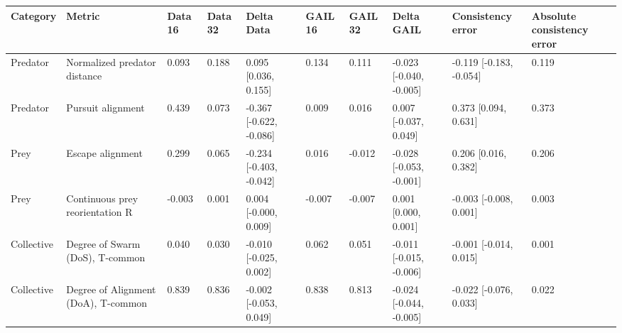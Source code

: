 \begin{tabular}{llllllllll}
\toprule
Category & Metric & Data 16 & Data 32 & Delta Data & GAIL 16 & GAIL 32 & Delta GAIL & Consistency error & Absolute consistency error \\
\midrule
Predator & Normalized predator distance & 0.093 & 0.188 & 0.095 [0.036, 0.155] & 0.134 & 0.111 & -0.023 [-0.040, -0.005] & -0.119 [-0.183, -0.054] & 0.119 \\
Predator & Pursuit alignment & 0.439 & 0.073 & -0.367 [-0.622, -0.086] & 0.009 & 0.016 & 0.007 [-0.037, 0.049] & 0.373 [0.094, 0.631] & 0.373 \\
Prey & Escape alignment & 0.299 & 0.065 & -0.234 [-0.403, -0.042] & 0.016 & -0.012 & -0.028 [-0.053, -0.001] & 0.206 [0.016, 0.382] & 0.206 \\
Prey & Continuous prey reorientation R & -0.003 & 0.001 & 0.004 [-0.000, 0.009] & -0.007 & -0.007 & 0.001 [0.000, 0.001] & -0.003 [-0.008, 0.001] & 0.003 \\
Collective & Degree of Swarm (DoS), T-common & 0.040 & 0.030 & -0.010 [-0.025, 0.002] & 0.062 & 0.051 & -0.011 [-0.015, -0.006] & -0.001 [-0.014, 0.015] & 0.001 \\
Collective & Degree of Alignment (DoA), T-common & 0.839 & 0.836 & -0.002 [-0.053, 0.049] & 0.838 & 0.813 & -0.024 [-0.044, -0.005] & -0.022 [-0.076, 0.033] & 0.022 \\
\bottomrule
\end{tabular}
